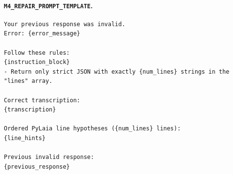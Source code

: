 \paragraph{\texttt{M4\_REPAIR\_PROMPT\_TEMPLATE}.}
\begin{lstlisting}[basicstyle=\scriptsize\ttfamily,breaklines=true,columns=fullflexible]
Your previous response was invalid.
Error: {error_message}

Follow these rules:
{instruction_block}
- Return only strict JSON with exactly {num_lines} strings in the "lines" array.

Correct transcription:
{transcription}

Ordered PyLaia line hypotheses ({num_lines} lines):
{line_hints}

Previous invalid response:
{previous_response}
\end{lstlisting}

